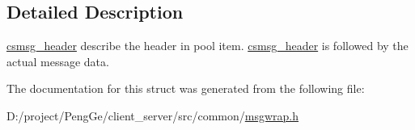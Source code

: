\subsection{Detailed Description}
\hyperlink{structcsmsg__header}{csmsg\+\_\+header} describe the header in pool item. \hyperlink{structcsmsg__header}{csmsg\+\_\+header} is followed by the actual message data. 

The documentation for this struct was generated from the following file\+:\begin{DoxyCompactItemize}
\item 
D\+:/project/\+Peng\+Ge/client\+\_\+server/src/common/\hyperlink{msgwrap_8h}{msgwrap.\+h}\end{DoxyCompactItemize}
